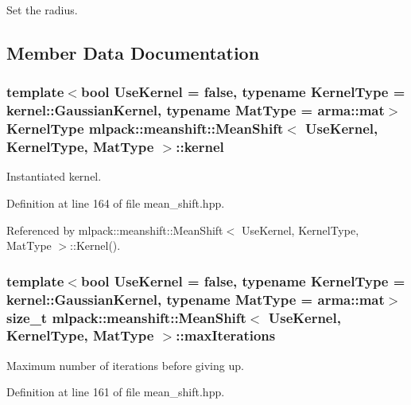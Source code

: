 Set the radius. 



\subsection{Member Data Documentation}
\subsubsection[{kernel}]{\setlength{\rightskip}{0pt plus 5cm}template$<$bool Use\+Kernel = false, typename Kernel\+Type  = kernel\+::\+Gaussian\+Kernel, typename Mat\+Type  = arma\+::mat$>$ Kernel\+Type {\bf mlpack\+::meanshift\+::\+Mean\+Shift}$<$ Use\+Kernel, Kernel\+Type, Mat\+Type $>$\+::kernel\hspace{0.3cm}{\ttfamily [private]}}\label{classmlpack_1_1meanshift_1_1MeanShift_a1afba2513233536f47117a7b86e8384b}


Instantiated kernel. 



Definition at line 164 of file mean\+\_\+shift.\+hpp.



Referenced by mlpack\+::meanshift\+::\+Mean\+Shift$<$ Use\+Kernel, Kernel\+Type, Mat\+Type $>$\+::\+Kernel().

\subsubsection[{max\+Iterations}]{\setlength{\rightskip}{0pt plus 5cm}template$<$bool Use\+Kernel = false, typename Kernel\+Type  = kernel\+::\+Gaussian\+Kernel, typename Mat\+Type  = arma\+::mat$>$ size\+\_\+t {\bf mlpack\+::meanshift\+::\+Mean\+Shift}$<$ Use\+Kernel, Kernel\+Type, Mat\+Type $>$\+::max\+Iterations\hspace{0.3cm}{\ttfamily [private]}}\label{classmlpack_1_1meanshift_1_1MeanShift_ad84529171961bfad9b63e9c0bf76384f}


Maximum number of iterations before giving up. 



Definition at line 161 of file mean\+\_\+shift.\+hpp.




